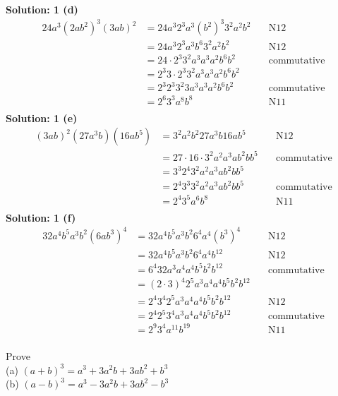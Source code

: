 \documentclass[6pt]{article}
\begin{document}
\textbf{Solution: 1 (d)}
\begin{align*}
24 a^3 {(2 a b^2)}^3 {(3 a b)}^2 &= 24 a^3 2^3 a^3 {(b^2)}^3 3^2 a^2 b^2 & \quad \text{N12} \\
&= 24 a^3 2^3 a^3 b^6 3^2 a^2 b^2 & \quad \text{N12} \\
&= 24 \cdot 2^3 3^2 a^3 a^3 a^2 b^6 b^2 & \quad \text{commutative} \\
&= 2^3 3 \cdot 2^3 3^2 a^3 a^3 a^2 b^6 b^2 & \quad \text{} \\
&= 2^3 2^3 3^2 3 a^3 a^3 a^2 b^6 b^2 & \quad \text{commutative} \\
&= 2^6 3^3 a^8 b^8 & \quad \text{N11} \\
\end{align*}
\textbf{Solution: 1 (e)}
\begin{align*}
{(3 a b)}^2 (27 a^3 b) (16 a b^5) &= 3^2 a^2 b^2 27 a^3 b 16 a b^5 & \quad \text{N12} \\
&= 27 \cdot 16 \cdot 3^2 a^2 a^3 a b^2 b b^5 & \quad \text{commutative} \\
&= 3^3 2^4 3^2 a^2 a^3 a b^2 b b^5 & \quad \text{} \\
&=  2^4 3^3 3^2 a^2 a^3 a b^2 b b^5 & \quad \text{commutative} \\
&=  2^4 3^5 a^6 b^8 & \quad \text{N11} \\
\end{align*}
\textbf{Solution: 1 (f)}
\begin{align*}
32 a^4 b^5 a^3 b^2 {(6 a b^3)}^4 &= 32 a^4 b^5 a^3 b^2 6^4 a^4 {(b^3)}^4 & \quad \text{N12} \\
&= 32 a^4 b^5 a^3 b^2 6^4 a^4 b^{12} & \quad \text{N12} \\
&= 6^4 32 a^3 a^4 a^4 b^5 b^2 b^{12} & \quad \text{commutative} \\
&= {(2 \cdot 3)}^4 2^5 a^3 a^4 a^4 b^5 b^2 b^{12} & \quad \text{} \\
&= 2^4 3^4 2^5 a^3 a^4 a^4 b^5 b^2 b^{12} & \quad \text{N12} \\
&= 2^4 2^5 3^4 a^3 a^4 a^4 b^5 b^2 b^{12} & \quad \text{commutative} \\
&= 2^9 3^4 a^{11} b^{19} & \quad \text{N11} \\
\end{align*}


\begin{tcolorbox}[title=Problem 2, breakable]
Prove \\
(a) ${(a + b)}^3 = a^3 + 3 a^2 b + 3 a b^2 + b^3$ \\
(b) ${(a - b)}^3 = a^3 - 3 a^2 b + 3 a b^2 - b^3$
\end{tcolorbox}
\end{document}
